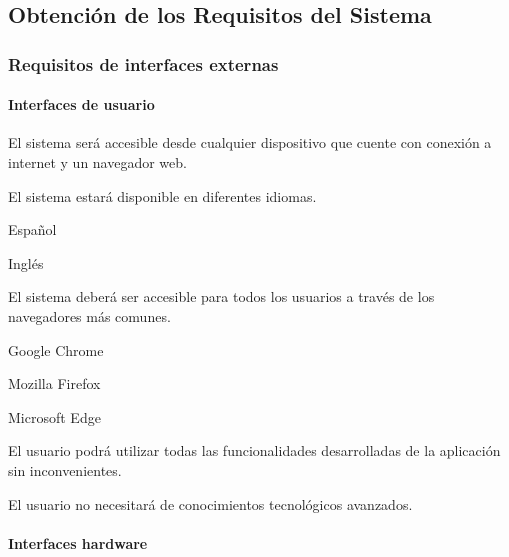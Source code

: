 \subsection{Obtención de los Requisitos del Sistema} 

\subsubsection{Requisitos de interfaces externas}

\paragraph*{Interfaces de usuario}
	

	\begin{myEnumIU}
		\item El sistema será accesible desde cualquier dispositivo que cuente con conexión a internet y un navegador web.
		\item El sistema estará disponible en diferentes idiomas.
		\begin{myEnumIU}
			\item Español
			\item Inglés
		\end{myEnumIU}
		\item El sistema deberá ser accesible para todos los usuarios a través de los navegadores más comunes.
		\begin{myEnumIU}
			\item Google Chrome
			\item Mozilla Firefox
			\item Microsoft Edge
		\end{myEnumIU}
		\item El usuario podrá utilizar todas las funcionalidades desarrolladas de la aplicación sin inconvenientes.
		\item El usuario no necesitará de conocimientos tecnológicos avanzados.
	\end{myEnumIU}

\paragraph*{Interfaces hardware}
	
